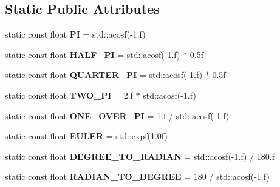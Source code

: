\subsection*{Static Public Attributes}
\begin{DoxyCompactItemize}
\item 
\mbox{\label{structdrider_s_d_k_1_1_math_af761af512f694c9f64cf0310c768d6ea}} 
static const float {\bfseries PI} = std\+::acosf(-\/1.f)
\item 
\mbox{\label{structdrider_s_d_k_1_1_math_adeab45bd85e72ba7dcf576d10c187527}} 
static const float {\bfseries H\+A\+L\+F\+\_\+\+PI} = std\+::acosf(-\/1.f) $\ast$ 0.\+5f
\item 
\mbox{\label{structdrider_s_d_k_1_1_math_ae50b59ff165a5556a518ff490fa7056e}} 
static const float {\bfseries Q\+U\+A\+R\+T\+E\+R\+\_\+\+PI} = std\+::acosf(-\/1.f) $\ast$ 0.\+5f
\item 
\mbox{\label{structdrider_s_d_k_1_1_math_a514e5cf3da73871eb5d9c73d40b6dc87}} 
static const float {\bfseries T\+W\+O\+\_\+\+PI} = 2.f $\ast$ std\+::acosf(-\/1.f)
\item 
\mbox{\label{structdrider_s_d_k_1_1_math_a5ddc52f32a2b8416613309d5a40f840b}} 
static const float {\bfseries O\+N\+E\+\_\+\+O\+V\+E\+R\+\_\+\+PI} = 1.f / std\+::acosf(-\/1.f)
\item 
\mbox{\label{structdrider_s_d_k_1_1_math_a7665bd4eba57a344c56ef94d542c0d93}} 
static const float {\bfseries E\+U\+L\+ER} = std\+::expf(1.\+0f)
\item 
\mbox{\label{structdrider_s_d_k_1_1_math_a44d17c4e7b54a31938fa0204678dad03}} 
static const float {\bfseries D\+E\+G\+R\+E\+E\+\_\+\+T\+O\+\_\+\+R\+A\+D\+I\+AN} = std\+::acosf(-\/1.f) / 180.f
\item 
\mbox{\label{structdrider_s_d_k_1_1_math_a5072cb0a9a877c411b093b0461a15a1f}} 
static const float {\bfseries R\+A\+D\+I\+A\+N\+\_\+\+T\+O\+\_\+\+D\+E\+G\+R\+EE} = 180 / std\+::acosf(-\/1.f)
\item 

\end{DoxyCompactItemize}
